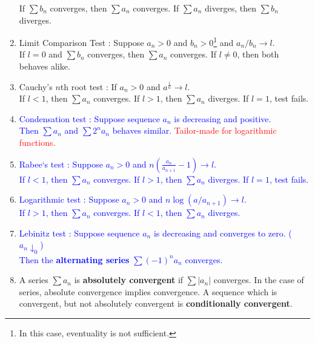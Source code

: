 \begin{enumerate}
		If $\sum b_n$ converges, then $\sum a_n$ converges. If $\sum a_n$ diverges, then $\sum b_n$ diverges.
	\item { \color{red}Limit Comparison Test : Suppose $a_n > 0$ and $b_n > 0$\footnote{In this case, eventuality is not sufficient.} and $a_n/b_n \to l$.\\
		If $l = 0$ and $\sum b_n$ converges, then $\sum a_n$ converges.
		If $l \ne 0$, then both behaves alike.}
	\item Cauchy's $n$th root test : If $a_n > 0$ and $a^\frac{1}{n} \to l$.\\
		If $l < 1$, then $\sum a_n$ converges. If $l > 1$, then $\sum a_n$ diverges. If $l = 1$, test fails.
	\item \textcolor{blue}{Condensation test : Suppose sequence $a_n$ is decreasing and positive.\\
		Then $\sum a_n$ and $\sum 2^na_n$ behaves similar. \textcolor{red}{Tailor-made for logarithmic functions.}}
	\item \textcolor{blue}{Rabee`s test : Suppose $a_n > 0$ and $n\left(\frac{a_n}{a_{n+1}} -1 \right) \to l$.\\
		If $l < 1$, then $\sum a_n$ converges. If $l > 1$, then $\sum a_n$ diverges. If $l = 1$, test fails.}
	\item \textcolor{blue}{Logarithmic test : Suppose $a_n > 0$ and $n\log (a/a_{n+1}) \to l$.\\
		If $l > 1$, then $\sum a_n$ converges. If $l <1$, then $\sum a_n$ diverges.}
	\item \textcolor{blue}{Lebinitz test : Suppose sequence $a_n$ is decreasing and converges to zero. ($a_n \downarrow_0$)\\
		Then the \textbf{alternating series} $\sum (-1)^n a_n$ converges.}
	\item A series $\sum a_n$ is \textbf{absolutely convergent} if $\sum |a_n|$ converges. In the case of series, absolute convergence implies convergence. A sequence which is convergent, but not absolutely convergent is \textbf{conditionally convergent}.
\end{enumerate}
